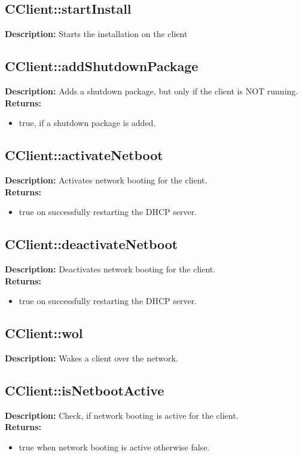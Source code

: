 \subsection{CClient::startInstall}
\textbf{Description:} Starts the installation on the client\\

\subsection{CClient::addShutdownPackage}
\textbf{Description:} Adds a shutdown package, but only if the client is NOT running.\\
\textbf{Returns:}
\begin{itemize}
\item true, if a shutdown package is added.
\end{itemize}

\subsection{CClient::activateNetboot}
\textbf{Description:} Activates network booting for the client.\\
\textbf{Returns:}
\begin{itemize}
\item true on successfully restarting the DHCP server.
\end{itemize}

\subsection{CClient::deactivateNetboot}
\textbf{Description:} Deactivates network booting for the client.\\
\textbf{Returns:}
\begin{itemize}
\item true on successfully restarting the DHCP server.
\end{itemize}

\subsection{CClient::wol}
\textbf{Description:} Wakes a client over the network.\\

\subsection{CClient::isNetbootActive}
\textbf{Description:} Check, if network booting is active for the client.\\
\textbf{Returns:}
\begin{itemize}
\item true when network booting is active otherwise false.
\end{itemize}


